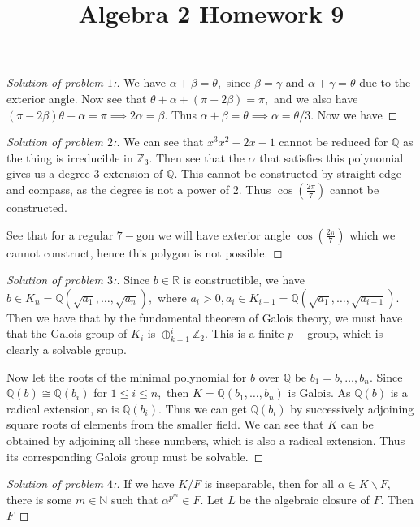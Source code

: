 \documentclass[letterpaper,11pt,twoside]{article}
\title{Algebra 2 Homework 9}
\theoremstyle{proposition}
\theoremstyle{definition}
\theoremstyle{theorem}
\theoremstyle{definition}
\theoremstyle{definition}
\theoremstyle{definition}
\theoremstyle{lemma}
\theoremstyle{definition}
\theoremstyle{definition}
\theoremstyle{corollary}
\theoremstyle{definition}
\theoremstyle{definition}
\theoremstyle{definition}
\begin{document}
	\maketitle
	\begin{proof}[Solution of problem $1$:]
	We have $\alpha+\beta = \theta,$ since $ \beta= \gamma $ and $ \alpha + \gamma = \theta $ due to the exterior angle. 
	Now see that $\theta + \alpha + (\pi - 2\beta) = \pi, $ and we also have $  (\pi - 2\beta) \theta + \alpha= \pi \implies 2\alpha = \beta. $
	Thus $\alpha + \beta = \theta \implies \alpha = \theta/3.$
	Now we have 	
	\end{proof}
	\begin{proof}[Solution of problem $2$:]
	We can see that $x^3x^2-2x-1$ cannot be reduced for $\mathbb{Q}$ as the thing is irreducible in $\mathbb{Z}_3$. 
	Then see that the $\alpha$ that satisfies this polynomial gives us a degree $3$ extension of $\mathbb{Q}.$ 
	This cannot be constructed by straight edge and compass, as the degree is not a power of $2.$ 
	Thus $\cos \left(\frac{2 \pi}{7}\right)$ cannot be constructed.
	
	See that for a regular $7-$gon we will have exterior angle $\cos \left(\frac{2 \pi}{7}\right)$ which we cannot construct, hence this polygon is not 
	possible.
\end{proof}
	\begin{proof}[Solution of problem $3$:]
	Since $b \in \mathbb{R}$ is constructible, we have $b \in K_n= \mathbb{Q}(\sqrt{a_1},\dots, \sqrt{a_n}),$ where $ a_i >0, a_i \in 
	K_{i-1}=\mathbb{Q}(\sqrt{a_1},\dots, \sqrt{a_{i-1}}).$ Then we have that by the fundamental theorem of Galois theory, we must have that the Galois group 
	of $K_i$ is $\oplus_{k=1}^i \mathbb{Z}_2.$ This is a finite $p-$group, which is clearly a solvable group. 
	
	Now let the roots of the minimal polynomial for $b$ over $\mathbb{Q}$ be $b_1=b, \dots, b_n.$ Since $\mathbb{Q}(b) \cong \mathbb{Q}(b_i)$ for $1 \leq i 
	\leq n,$ then $K=\mathbb{Q}(b_1,\dots, b_n)$ is Galois. As $\mathbb{Q}(b)$ is a radical extension, so is $\mathbb{Q}(b_i).$ Thus we can get 
	$\mathbb{Q}(b_i) $ by successively adjoining square roots of elements from the smaller field. We can see that $K$ can be obtained by adjoining all these 
	numbers, which is also a radical extension. Thus its corresponding Galois group must be solvable.   
\end{proof}
	\begin{proof}[Solution of problem $4$:]
	If we have $K/F$ is inseparable, then for all $\alpha \in K\backslash F,$ there is some $m \in \mathbb{N}$ such that $\alpha^{p^m} \in F.$ Let $L$ be 
	the algebraic closure of $F.$ Then $F $
\end{proof}
\end{document}
